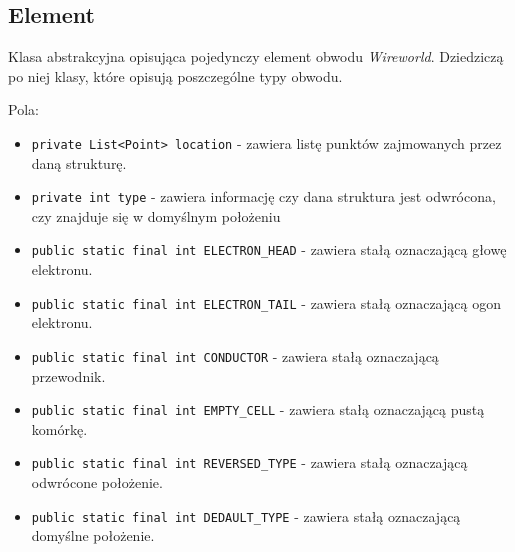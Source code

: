 \documentclass[a4paper,11pt, notitlepage ]{article}
\begin{document}
\subsection{Element}
Klasa abstrakcyjna opisująca pojedynczy element obwodu \textsl{Wireworld}. Dziedziczą po niej klasy, które opisują poszczególne typy obwodu.

Pola:
\begin{itemize}
\item \verb+private List<Point> location+ - zawiera listę punktów
zajmowanych przez daną strukturę.
\item \verb+private int type+ - zawiera informację czy dana struktura jest odwrócona, czy znajduje się w domyślnym położeniu
\item \verb+public static final int ELECTRON_HEAD+ - zawiera stałą oznaczającą głowę elektronu.
\item \verb+public static final int ELECTRON_TAIL+ - zawiera stałą oznaczającą ogon elektronu.
\item \verb+public static final int CONDUCTOR+ - zawiera stałą oznaczającą przewodnik.
\item \verb+public static final int EMPTY_CELL+ - zawiera stałą oznaczającą pustą komórkę.
\item \verb+public static final int REVERSED_TYPE+ - zawiera stałą oznaczającą odwrócone położenie.
\item \verb+public static final int DEDAULT_TYPE+ - zawiera stałą oznaczającą domyślne położenie. 
\end{itemize}
\end{document}
